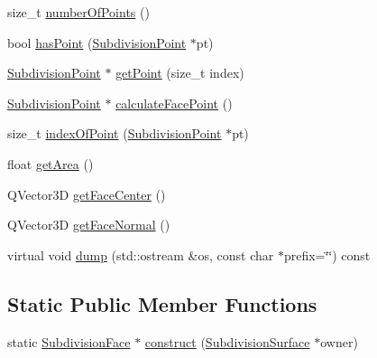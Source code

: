 \begin{DoxyCompactItemize}
\item 
size\-\_\-t \hyperlink{classShipCADGeometry_1_1SubdivisionFace_acb8b1174cf96615f4e84ca4e62f5979c}{number\-Of\-Points} ()
\item 
bool \hyperlink{classShipCADGeometry_1_1SubdivisionFace_a575f9199178fc28c9229fa4c7d2824ef}{has\-Point} (\hyperlink{classShipCADGeometry_1_1SubdivisionPoint}{Subdivision\-Point} $\ast$pt)
\item 
\hyperlink{classShipCADGeometry_1_1SubdivisionPoint}{Subdivision\-Point} $\ast$ \hyperlink{classShipCADGeometry_1_1SubdivisionFace_a0df579a3063c124ca2355eba4ece7480}{get\-Point} (size\-\_\-t index)
\item 
\hyperlink{classShipCADGeometry_1_1SubdivisionPoint}{Subdivision\-Point} $\ast$ \hyperlink{classShipCADGeometry_1_1SubdivisionFace_aeb9c6f01f3896dc39819265922a04892}{calculate\-Face\-Point} ()
\item 
size\-\_\-t \hyperlink{classShipCADGeometry_1_1SubdivisionFace_a8b32525b95c836e065cb124a61caec61}{index\-Of\-Point} (\hyperlink{classShipCADGeometry_1_1SubdivisionPoint}{Subdivision\-Point} $\ast$pt)
\item 
float \hyperlink{classShipCADGeometry_1_1SubdivisionFace_ace99f0fe3b54e57912e5391e0aff84ea}{get\-Area} ()
\item 
Q\-Vector3\-D \hyperlink{classShipCADGeometry_1_1SubdivisionFace_a3574fd6a4241a81faa7f2ff741d07811}{get\-Face\-Center} ()
\item 
Q\-Vector3\-D \hyperlink{classShipCADGeometry_1_1SubdivisionFace_add361089333f9d08a411d16ea1782246}{get\-Face\-Normal} ()
\item 
virtual void \hyperlink{classShipCADGeometry_1_1SubdivisionFace_aa5bd261ae5fc0a1c7fe8cc5328b8477f}{dump} (std\-::ostream \&os, const char $\ast$prefix=\char`\"{}\char`\"{}) const 
\end{DoxyCompactItemize}
\subsection*{Static Public Member Functions}
\begin{DoxyCompactItemize}
\item 
static \hyperlink{classShipCADGeometry_1_1SubdivisionFace}{Subdivision\-Face} $\ast$ \hyperlink{classShipCADGeometry_1_1SubdivisionFace_a4a6f182fa7e5cf63fc95c7614805f136}{construct} (\hyperlink{classShipCADGeometry_1_1SubdivisionSurface}{Subdivision\-Surface} $\ast$owner)
\end{DoxyCompactItemize}

